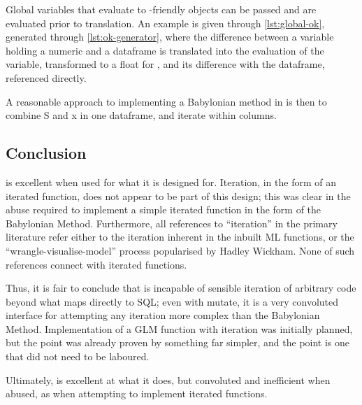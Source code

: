 

Global variables that evaluate to -friendly objects can be passed and are evaluated prior to translation.
An example is given through \cref{lst:global-ok}, generated through \cref{lst:ok-generator}, where the difference between a variable holding a numeric and a  dataframe is translated into the evaluation of the variable, transformed to a float for , and its difference with the  dataframe, referenced directly.



A reasonable approach to implementing a Babylonian method in  is then to combine S and x in one dataframe, and iterate within columns.


\subsection{Conclusion}\label{subsec:sparklyr-conclusion}

 is excellent when used for what it is designed for.
Iteration, in the form of an iterated function, does not appear to be part of this design; this was clear in the abuse required to implement a simple iterated function in the form of the Babylonian Method.
Furthermore, all references to ``iteration'' in the primary  literature refer either to the iteration inherent in the inbuilt  ML functions, or the ``wrangle-visualise-model'' process popularised by Hadley Wickham\cite{luraschi2019mastering}\cite{wickham2016r}.
None of such references connect with iterated functions.

Thus, it is fair to conclude that  is incapable of sensible iteration of arbitrary \R{} code beyond what maps directly to SQL; even with mutate, it is a very convoluted interface for attempting any iteration more complex than the Babylonian Method.
Implementation of a GLM function with  iteration was initially planned, but the point was already proven by something far simpler, and the point is one that did not need to be laboured.

Ultimately,  is excellent at what it does, but convoluted and inefficient when abused, as when attempting to implement iterated functions.
